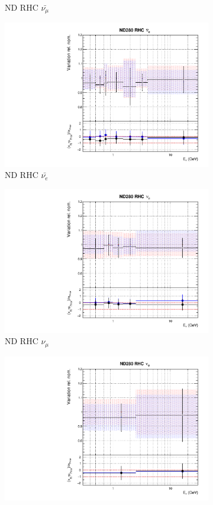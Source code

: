 \begin{figure}[t]
\begin{subfigure}{0.24\textwidth}
  \caption{ND RHC $\bar{\nu_{\mu}}$}
\end{subfigure}
\begin{subfigure}{0.24\textwidth}
  \centering
  \includegraphics[width=0.95\linewidth]{figs/rhcmpasmvflux5}
  \caption{ND RHC $\bar{\nu_{e}}$}
\end{subfigure}
\begin{subfigure}{0.24\textwidth}
  \centering
  \includegraphics[width=0.95\linewidth]{figs/rhcmpasmvflux6}
  \caption{ND RHC $\nu_{\mu}$}
\end{subfigure}
\vspace{15mm}
\begin{subfigure}{0.24\textwidth}
  \centering
  \includegraphics[width=0.95\linewidth]{figs/rhcmpasmvflux7}

\end{subfigure}
\end{figure}
